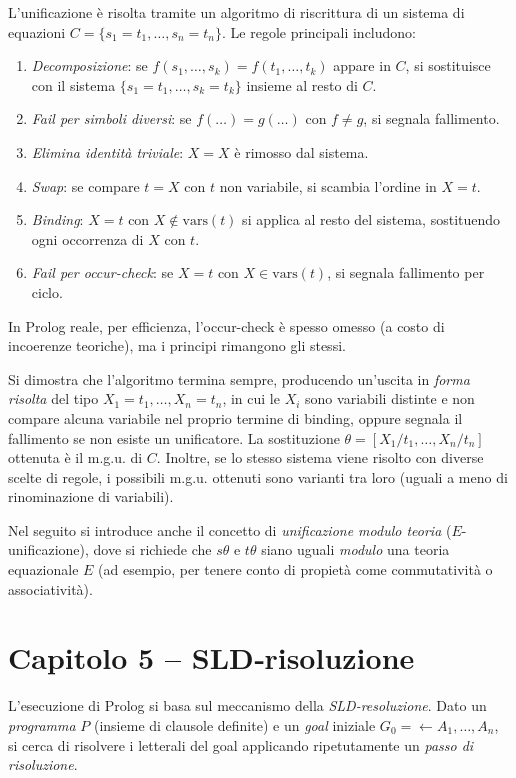 \documentclass[12pt]{article}
\begin{document}
L'unificazione è risolta tramite un algoritmo di riscrittura di un sistema di equazioni $C = \{s_1 = t_1,\dots,s_n = t_n\}$. Le regole principali includono:
\begin{enumerate}
  \item \emph{Decomposizione}: se $f(s_1,\dots,s_k) = f(t_1,\dots,t_k)$ appare in $C$, si sostituisce con il sistema $\{s_1=t_1,\dots,s_k=t_k\}$ insieme al resto di $C$.
  \item \emph{Fail per simboli diversi}: se $f(\dots) = g(\dots)$ con $f\neq g$, si segnala fallimento.
  \item \emph{Elimina identità triviale}: $X=X$ è rimosso dal sistema.
  \item \emph{Swap}: se compare $t=X$ con $t$ non variabile, si scambia l'ordine in $X=t$.
  \item \emph{Binding}: $X=t$ con $X\notin \mathrm{vars}(t)$ si applica al resto del sistema, sostituendo ogni occorrenza di $X$ con $t$.
  \item \emph{Fail per occur-check}: se $X=t$ con $X\in \mathrm{vars}(t)$, si segnala fallimento per ciclo.
\end{enumerate}
In Prolog reale, per efficienza, l'occur-check è spesso omesso (a costo di incoerenze teoriche), ma i principi rimangono gli stessi.

Si dimostra che l'algoritmo termina sempre, producendo un’uscita in \emph{forma risolta} del tipo $X_1 = t_1, \dots, X_n = t_n$, in cui le $X_i$ sono variabili distinte e non compare alcuna variabile nel proprio termine di binding, oppure segnala il fallimento se non esiste un unificatore. La sostituzione $\theta = [X_1/t_1, \dots, X_n/t_n]$ ottenuta è il m.g.u. di $C$. Inoltre, se lo stesso sistema viene risolto con diverse scelte di regole, i possibili m.g.u. ottenuti sono varianti tra loro (uguali a meno di rinominazione di variabili).

Nel seguito si introduce anche il concetto di \emph{unificazione modulo teoria} ($E$-unificazione), dove si richiede che $s\theta$ e $t\theta$ siano uguali \emph{modulo} una teoria equazionale $E$ (ad esempio, per tenere conto di propietà come commutatività o associatività).

\section*{Capitolo 5 – SLD‐risoluzione}

L'esecuzione di Prolog si basa sul meccanismo della \emph{SLD-resoluzione}. Dato un \emph{programma} $P$ (insieme di clausole definite) e un \emph{goal} iniziale $G_0 = \leftarrow A_1,\dots,A_n$, si cerca di risolvere i letterali del goal applicando ripetutamente un \emph{passo di risoluzione}. 
\end{document}
